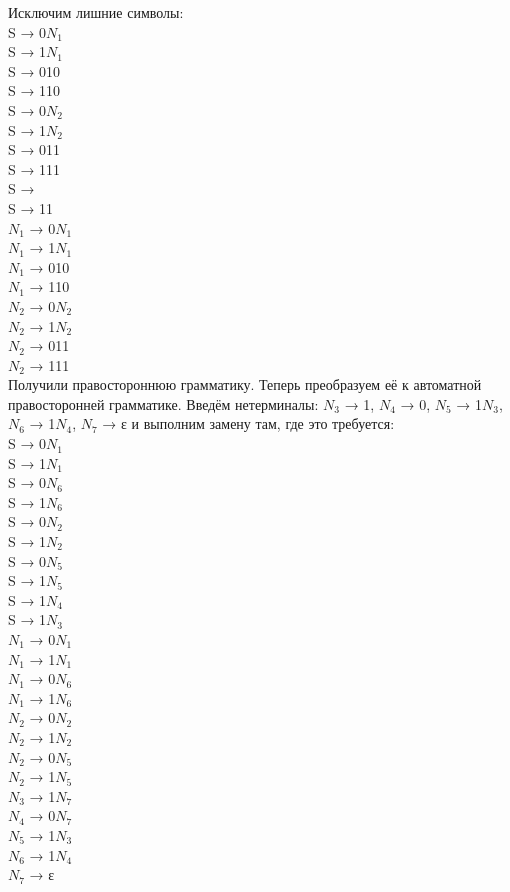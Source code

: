 \documentclass[a4paper,14pt]{extarticle}
\begin{document}
\begin{enumerate}[1.]
Исключим лишние символы:\\
S → 0$N_1$\\
S → 1$N_1$\\
S → 010\\
S → 110\\
S → 0$N_2$\\
S → 1$N_2$\\
S → 011\\
S → 111\\
S → \\
S → 11\\
$N_1$ → 0$N_1$\\
$N_1$ → 1$N_1$\\
$N_1$ → 010\\
$N_1$ → 110\\
$N_2$ → 0$N_2$\\
$N_2$ → 1$N_2$\\
$N_2$ → 011\\
$N_2$ → 111\\

    Получили правостороннюю грамматику. Теперь преобразуем её к автоматной правосторонней грамматике. 
    Введём нетерминалы: $N_3$ → 1, $N_4$ → 0, $N_5$ → 1$N_3$, $N_6$ → 1$N_4$, $N_7$ → ε и выполним замену там, где это требуется:\\ 

S → 0$N_1$\\
S → 1$N_1$\\
S → 0$N_6$\\
S → 1$N_6$\\
S → 0$N_2$\\
S → 1$N_2$\\
S → 0$N_5$\\
S → 1$N_5$\\
S → 1$N_4$\\
S → 1$N_3$\\
$N_1$ → 0$N_1$\\
$N_1$ → 1$N_1$\\
$N_1$ → 0$N_6$\\
$N_1$ → 1$N_6$\\
$N_2$ → 0$N_2$\\
$N_2$ → 1$N_2$\\
$N_2$ → 0$N_5$\\
$N_2$ → 1$N_5$\\
$N_3$ → 1$N_7$\\
$N_4$ → 0$N_7$\\
$N_5$ → 1$N_3$\\
$N_6$ → 1$N_4$\\
$N_7$ → ε\\


\end{enumerate}
\end{document}
